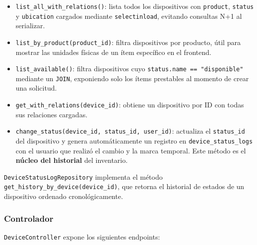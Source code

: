 \begin{itemize}
	\item \texttt{list\_all\_with\_relations()}: lista todos los dispositivos con \texttt{product}, \texttt{status} y \texttt{ubication} cargados mediante \texttt{selectinload}, evitando consultas N+1 al serializar.
	\item \texttt{list\_by\_product(product\_id)}: filtra dispositivos por producto, útil para mostrar las unidades físicas de un ítem específico en el frontend.
	\item \texttt{list\_available()}: filtra dispositivos cuyo \texttt{status.name == "disponible"} mediante un \texttt{JOIN}, exponiendo solo los ítems prestables al momento de crear una solicitud.
	\item \texttt{get\_with\_relations(device\_id)}: obtiene un dispositivo por ID con todas sus relaciones cargadas.
	\item \texttt{change\_status(device\_id, status\_id, user\_id)}: actualiza el \texttt{status\_id} del dispositivo y genera automáticamente un registro en \texttt{device\_status\_logs} con el usuario que realizó el cambio y la marca temporal. Este método es el \textbf{núcleo del historial} del inventario.
\end{itemize}

\texttt{DeviceStatusLogRepository} implementa el método \\ \texttt{get\_history\_by\_device(device\_id)}, que retorna el historial de estados de un dispositivo ordenado cronológicamente.

\subsubsection*{Controlador}

\texttt{DeviceController} expone los siguientes endpoints:

